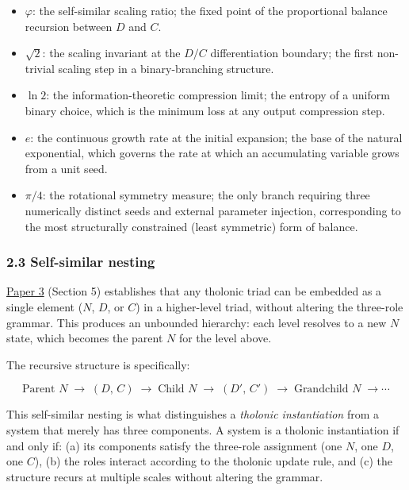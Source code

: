 \documentclass[
  11pt,
  letterpaper,
]{article}
\providecommand{\tightlist}{%
  \setlength{\itemsep}{0pt}\setlength{\parskip}{0pt}}
\begin{document}
\begin{itemize}
\tightlist
\item
  \(\varphi\): the self-similar scaling ratio; the fixed point of the
  proportional balance recursion between \(D\) and \(C\).
\item
  \(\sqrt{2}\): the scaling invariant at the \(D/C\) differentiation
  boundary; the first non-trivial scaling step in a binary-branching
  structure.
\item
  \(\ln 2\): the information-theoretic compression limit; the entropy of
  a uniform binary choice, which is the minimum loss at any output
  compression step.
\item
  \(e\): the continuous growth rate at the initial expansion; the base
  of the natural exponential, which governs the rate at which an
  accumulating variable grows from a unit seed.
\item
  \(\pi/4\): the rotational symmetry measure; the only branch requiring
  three numerically distinct seeds and external parameter injection,
  corresponding to the most structurally constrained (least symmetric)
  form of balance.
\end{itemize}

\subsubsection{2.3 Self-similar nesting}\label{self-similar-nesting}

\href{https://github.com/baardev/truevalue/blob/main/docnav/Research/papers/3_minimal-recursive-triadic-framework/3_minimal-recursive-triadic-framework.pdf}{Paper
3} (Section 5) establishes that any tholonic triad can be embedded as a
single element (\(N\), \(D\), or \(C\)) in a higher-level triad, without
altering the three-role grammar. This produces an unbounded hierarchy:
each level resolves to a new \(N\) state, which becomes the parent \(N\)
for the level above.

The recursive structure is specifically:

\[\text{Parent } N \;\longrightarrow\; (D,\, C) \;\longrightarrow\; \text{Child } N \;\longrightarrow\; (D',\, C') \;\longrightarrow \;\text{Grandchild } N \;\longrightarrow \cdots\]

This self-similar nesting is what distinguishes a \emph{tholonic
instantiation} from a system that merely has three components. A system
is a tholonic instantiation if and only if: (a) its components satisfy
the three-role assignment (one \(N\), one \(D\), one \(C\)), (b) the
roles interact according to the tholonic update rule, and (c) the
structure recurs at multiple scales without altering the grammar.
\end{document}
